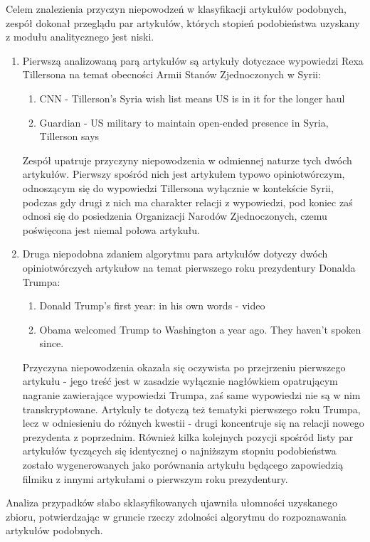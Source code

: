 Celem znalezienia przyczyn niepowodzeń w klasyfikacji artykułów podobnych, zespół dokonał przeglądu par artykułów, których stopień podobieństwa uzyskany z modułu analitycznego jest niski.
\begin{enumerate}
	\item Pierwszą analizowaną parą artykułów są artykuły dotyczace wypowiedzi Rexa Tillersona na temat obecności Armii Stanów Zjednoczonych w Syrii:
	\begin{enumerate}
		\item CNN - Tillerson's Syria wish list means US is in it for the longer haul 
		\item Guardian - 
US military to maintain open-ended presence in Syria, Tillerson says
	\end{enumerate}
	Zespół upatruje przyczyny niepowodzenia w odmiennej naturze tych dwóch artykułów. Pierwszy spośród nich jest artykułem typowo opiniotwórczym, odnoszącym się do wypowiedzi Tillersona wyłącznie w kontekście Syrii, podczas gdy drugi z nich ma charakter relacji z wypowiedzi, pod koniec zaś odnosi się do posiedzenia Organizacji Narodów Zjednoczonych, czemu poświęcona jest niemal połowa artykułu.
	
	\item Druga niepodobna zdaniem algorytmu para artykułów dotyczy dwóch opiniotwórczych artykułow na temat pierwszego roku prezydentury Donalda Trumpa:
	\begin{enumerate}
		\item Donald Trump's first year: in his own words - video
		\item Obama welcomed Trump to Washington a year ago. They haven't spoken since.
	\end{enumerate}
	Przyczyna niepowodzenia okazała się oczywista po przejrzeniu pierwszego artykułu - jego treść jest w zasadzie wyłącznie nagłówkiem opatrującym nagranie zawierające wypowiedzi Trumpa, zaś same wypowiedzi nie są w nim transkryptowane.  Artykuły te dotyczą też tematyki pierwszego roku Trumpa, lecz w odniesieniu do różnych kwestii - drugi koncentruje się na relacji nowego prezydenta z poprzednim. Również kilka kolejnych pozycji spośród listy par artykułów tyczących się identycznej o najniższym stopniu podobieństwa zostało wygenerowanych jako porównania artykułu będącego zapowiedzią filmiku z innymi artykułami o pierwszym roku prezydentury.
\end{enumerate}

Analiza przypadków słabo sklasyfikowanych ujawniła ułomności uzyskanego zbioru, potwierdzając w gruncie rzeczy zdolności algorytmu do rozpoznawania artykułów podobnych.

